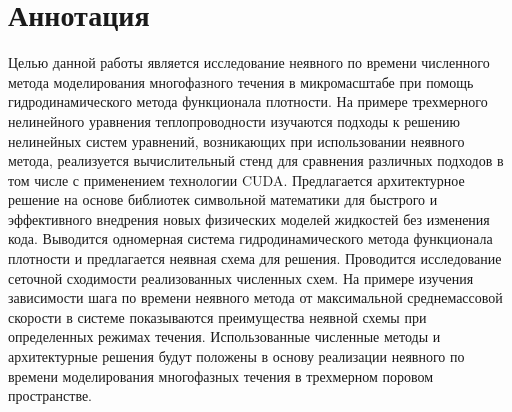\documentclass[a4paper,12pt]{article}
\begin{document}





\section*{Аннотация}
Целью данной работы является исследование неявного по времени численного метода моделирования многофазного течения в микромасштабе при помощь гидродинамического метода функционала плотности. На примере трехмерного нелинейного уравнения теплопроводности изучаются подходы к решению нелинейных систем уравнений, возникающих при использовании неявного метода, реализуется вычислительный стенд для сравнения различных подходов в том числе с применением технологии CUDA. Предлагается архитектурное решение на основе библиотек символьной математики для быстрого и эффективного внедрения новых физических моделей жидкостей без изменения кода. Выводится одномерная система гидродинамического метода функционала плотности и предлагается неявная схема для решения. Проводится исследование сеточной сходимости реализованных численных схем.  На примере изучения зависимости шага по времени неявного метода от максимальной среднемассовой скорости в системе показываются преимущества неявной схемы при определенных режимах течения. Использованные численные методы и архитектурные решения будут положены в основу реализации неявного по времени моделирования многофазных течения в трехмерном поровом пространстве.

\newpage

\tableofcontents

\newpage
\end{document}
